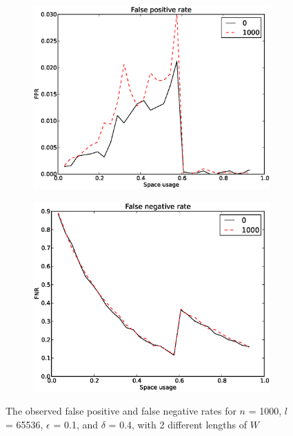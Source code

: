 \documentclass[a4paper,11pt]{article}
\begin{document}
\begin{figure}[H]
\centering
\begin{subfigure}{.5\textwidth}
  \centering
  \includegraphics[width=.95\linewidth]{wildcard_1000_FPR1}
\end{subfigure}%
\begin{subfigure}{.5\textwidth}
  \centering
  \includegraphics[width=.95\linewidth]{wildcard_1000_FNR1}
\end{subfigure}
\caption{The observed false positive and false negative rates for $n$ = 1000, $l$ = 65536, $\epsilon$ = 0.1, and $\delta$ = 0.4, with 2 different lengths of $W$}
\label{fig:w-fpnr}
\end{figure}
\end{document}
